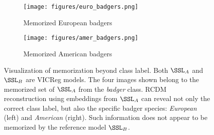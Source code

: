 \begin{figure}[t!]
     \centering
     \begin{subfigure}[b]{0.49\textwidth}
         \centering
         \texttt{[image: figures/euro\_badgers.png]}
         \caption{{\color{part_orange}Memorized} European badgers}
         \label{fig:euro badgers}
     \end{subfigure}
     \hfill
     \begin{subfigure}[b]{0.49\textwidth}
         \centering
         \texttt{[image: figures/amer\_badgers.png]}
         \caption{{\color{part_orange}Memorized} American badgers}
         \label{fig:amer badgers}
     \end{subfigure}
\caption{
Visualization of \dejavu memorization beyond class label. Both $\SSL_A$ and $\SSL_B$ are VICReg models. 
The four images shown belong to the {\color{part_orange}memorized} set of $\SSL_A$ from the \emph{badger} class. RCDM reconstruction using embeddings from $\SSL_A$ can reveal not only the correct class label, but also the specific badger species: \emph{European} (left) and \emph{American} (right). Such information does not appear to be memorized by the reference model $\SSL_B$.
} 
\label{fig:in class badger}
\vspace{-1.5em} 
\end{figure}